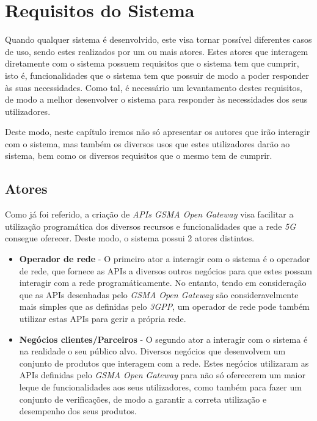 \chapter{Requisitos do Sistema}

Quando qualquer sistema é desenvolvido, este visa tornar possível diferentes casos de uso, sendo estes realizados por um ou mais atores.
Estes atores que interagem diretamente com o sistema possuem requisitos que o sistema tem que cumprir, isto é, funcionalidades que
o sistema tem que possuir de modo a poder responder às suas necessidades. Como tal, é necessário um levantamento destes requisitos, de modo
a melhor desenvolver o sistema para responder às necessidades dos seus utilizadores.

Deste modo, neste capítulo iremos não só apresentar os autores que irão interagir com o sistema, mas também os diversos usos que estes
utilizadores darão ao sistema, bem como os diversos requisitos que o mesmo tem de cumprir.

\section{Atores}

Como já foi referido, a criação de \emph{APIs GSMA Open Gateway} visa facilitar a utilização programática dos diversos recursos e
funcionalidades que a rede \emph{5G} consegue oferecer. Deste modo, o sistema possui 2 atores distintos.
\begin{itemize}
  \item \textbf{Operador de rede} - O primeiro ator a interagir com o sistema é o operador de rede,
    que fornece as APIs a diversos outros negócios para que estes possam interagir com a rede programáticamente. No entanto, tendo em
    consideração que as APIs desenhadas pelo \emph{GSMA Open Gateway} são consideravelmente mais simples que as definidas pelo \emph{3GPP},
    um operador de rede pode também utilizar estas APIs para gerir a própria rede.

  \item \textbf{Negócios clientes/Parceiros} - O segundo ator a interagir com o sistema é na realidade o seu público alvo. Diversos negócios
    que desenvolvem um conjunto de produtos que interagem com a rede. Estes negócios utilizaram as APIs definidas pelo \emph{GSMA Open Gateway}
    para não só oferecerem um maior leque de funcionalidades aos seus utilizadores, como também para fazer um conjunto de verificações, de modo
    a garantir a correta utilização e desempenho dos seus produtos.
\end{itemize}


